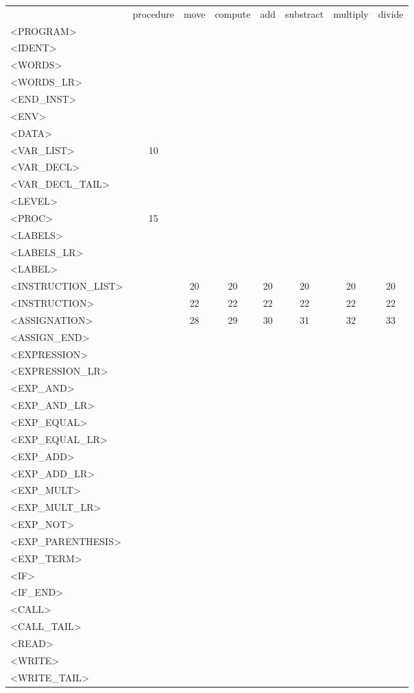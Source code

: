\documentclass[a4paper,11pt]{article}
\begin{document}
\newpage
\begin{longtable}{l||ccccccc}
	& procedure & move & compute & add & substract & multiply & divide \\
	<PROGRAM> & & & & & & & \\
	<IDENT> & & & & & & & \\
	<WORDS> & & & & & & & \\
	<WORDS\_LR> & & & & & & & \\
	<END\_INST> & & & & & & & \\
	<ENV> & & & & & & & \\
	<DATA> & & & & & & & \\
	<VAR\_LIST> & 10 & & & & & & \\
	<VAR\_DECL> & & & & & & & \\
	<VAR\_DECL\_TAIL> & & & & & & & \\
	<LEVEL> & & & & & & & \\
	<PROC> & 15 & & & & & & \\
	<LABELS> & & & & & & & \\
	<LABELS\_LR> & & & & & & & \\
	<LABEL> & & & & & & & \\
	<INSTRUCTION\_LIST> & & 20 & 20 & 20 & 20 & 20 & 20 \\
	<INSTRUCTION> & & 22 & 22 & 22 & 22 & 22 & 22 \\
	<ASSIGNATION> & & 28 & 29 & 30 & 31 & 32 & 33 \\
	<ASSIGN\_END> & & & & & & & \\
	<EXPRESSION> & & & & & & & \\
	<EXPRESSION\_LR> & & & & & & & \\
	<EXP\_AND> & & & & & & & \\
	<EXP\_AND\_LR> & & & & & & & \\
	<EXP\_EQUAL> & & & & & & & \\
	<EXP\_EQUAL\_LR> & & & & & & & \\
	<EXP\_ADD> & & & & & & & \\
	<EXP\_ADD\_LR> & & & & & & & \\
	<EXP\_MULT> & & & & & & & \\
	<EXP\_MULT\_LR> & & & & & & & \\
	<EXP\_NOT> & & & & & & & \\
	<EXP\_PARENTHESIS> & & & & & & & \\
	<EXP\_TERM> & & & & & & & \\
	<IF> & & & & & & & \\
	<IF\_END> & & & & & & & \\
	<CALL> & & & & & & & \\
	<CALL\_TAIL> & & & & & & & \\
	<READ> & & & & & & & \\
	<WRITE> & & & & & & & \\
	<WRITE\_TAIL> & & & & & & & \\
\end{longtable}
\end{document}

